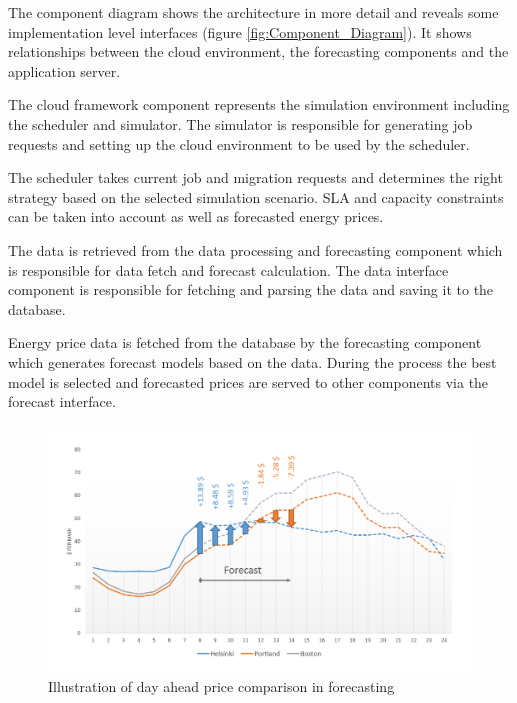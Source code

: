 \documentclass[paper=a4, fontsize=11pt]{scrartcl} %
\numberwithin{equation}{section} %
\numberwithin{figure}{section} %
\numberwithin{table}{section} %
\begin{document}
The component diagram shows the architecture in more detail and reveals some implementation level interfaces (figure \ref{fig:Component_Diagram}). It shows relationships between the cloud environment, the forecasting components and the application server. 

The cloud framework component represents the simulation environment including the scheduler and simulator. The simulator is responsible for generating job requests and setting up the cloud environment to be used by the scheduler. 

The scheduler takes current job and migration requests and determines the right strategy based on the selected simulation scenario. SLA and capacity constraints can be taken into account as well as forecasted energy prices. 

The data is retrieved from the data processing and forecasting component which is responsible for data fetch and forecast calculation. The data interface component is responsible for fetching and parsing the data and saving it to the database. 

Energy price data is fetched from the database by the forecasting component which generates forecast models based on the data. During the process the best model is selected and forecasted prices are served to other components via the forecast interface. 

\hspace{4cm}

\begin{figure}[htbp]
	\centering
		\includegraphics[width=\textwidth]{figures/Da_Prices_Forecast_Illustrated.png}
	\caption{Illustration of day ahead price comparison in forecasting}
	\label{fig:Da_Prices_Forecast}
\end{figure}
\end{document}
